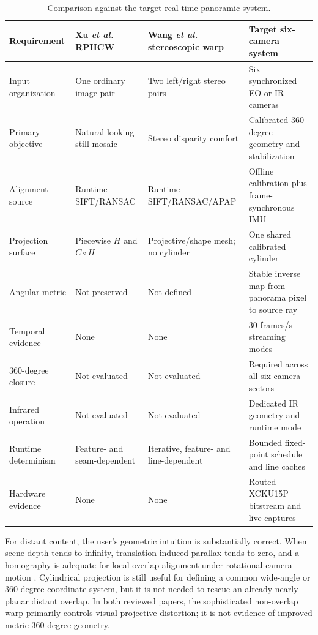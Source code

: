 \documentclass[10pt]{article}
\newcommand{\RPHCW}{RPHCW}
\begin{document}
\begin{table}[H]
\centering
\caption{Comparison against the target real-time panoramic system.}
\label{tab:req-comparison}
\small
\begin{tabularx}{\textwidth}{@{}p{3.05cm}YYY@{}}
\toprule
Requirement & Xu \emph{et al.} \RPHCW{} & Wang \emph{et al.} stereoscopic warp & Target six-camera system \\
\midrule
Input organization & One ordinary image pair & Two left/right stereo pairs & Six synchronized EO or IR cameras \\
Primary objective & Natural-looking still mosaic & Stereo disparity comfort & Calibrated 360-degree geometry and stabilization \\
Alignment source & Runtime SIFT/RANSAC & Runtime SIFT/RANSAC/APAP & Offline calibration plus frame-synchronous IMU \\
Projection surface & Piecewise $H$ and $C\circ H$ & Projective/shape mesh; no cylinder & One shared calibrated cylinder \\
Angular metric & Not preserved & Not defined & Stable inverse map from panorama pixel to source ray \\
Temporal evidence & None & None & 30 frames/s streaming modes \\
360-degree closure & Not evaluated & Not evaluated & Required across all six camera sectors \\
Infrared operation & Not evaluated & Not evaluated & Dedicated IR geometry and runtime mode \\
Runtime determinism & Feature- and seam-dependent & Iterative, feature- and line-dependent & Bounded fixed-point schedule and line caches \\
Hardware evidence & None & None & Routed XCKU15P bitstream and live captures \\
\bottomrule
\end{tabularx}
\end{table}

For distant content, the user's geometric intuition is substantially correct. When scene depth tends to infinity, translation-induced parallax tends to zero, and a homography is adequate for local overlap alignment under rotational camera motion \cite{brown2007}. Cylindrical projection is still useful for defining a common wide-angle or 360-degree coordinate system, but it is not needed to rescue an already nearly planar distant overlap. In both reviewed papers, the sophisticated non-overlap warp primarily controls visual projective distortion; it is not evidence of improved metric 360-degree geometry.
\end{document}
